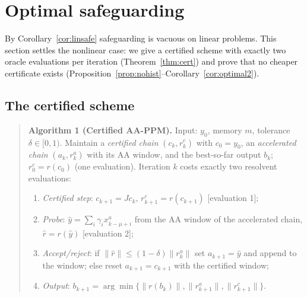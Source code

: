 \documentclass[11pt]{article}
\theoremstyle{definition}
\theoremstyle{remark}
\newcommand{\norm}[1]{\| #1 \|}
\begin{document}
\section{Optimal safeguarding}\label{sec:safeguard}

By Corollary~\ref{cor:linsafe} safeguarding is vacuous on linear problems.
This section settles the nonlinear case: we give a certified scheme with
exactly two oracle evaluations per iteration (Theorem~\ref{thm:cert}) and
prove that no cheaper certificate exists
(Proposition~\ref{prop:nohist}--Corollary~\ref{cor:optimal2}).

\subsection{The certified scheme}

\begin{quote}
\textbf{Algorithm 1 (Certified AA-PPM).} Input: $y_0$, memory $m$,
tolerance $\delta\in[0,1)$. Maintain a \emph{certified chain} $(c_k,r^c_k)$
with $c_0=y_0$, an \emph{accelerated chain} $(a_k,r^a_k)$ with its AA
window, and the best-so-far output $b_k$; $r^c_0=r(c_0)$ (one evaluation).
Iteration $k$ costs exactly two resolvent evaluations:
\begin{enumerate}[label=(\arabic*)]
\item \emph{Certified step}: $c_{k+1}=Jc_k$, $r^c_{k+1}=r(c_{k+1})$
      [evaluation 1];
\item \emph{Probe}: $\hat y=\sum_i\gamma_i x^a_{k-\mu+i}$ from the AA
      window of the accelerated chain, $\hat r=r(\hat y)$
      [evaluation 2];
\item \emph{Accept/reject}: if $\norm{\hat r}\le(1-\delta)\norm{r^a_k}$ set
      $a_{k+1}=\hat y$ and append to the window; else reset
      $a_{k+1}=c_{k+1}$ with the certified window;
\item \emph{Output}: $b_{k+1}=\arg\min\{\norm{r(b_k)},\norm{r^a_{k+1}},
      \norm{r^c_{k+1}}\}$.
\end{enumerate}
\end{quote}
\end{document}
